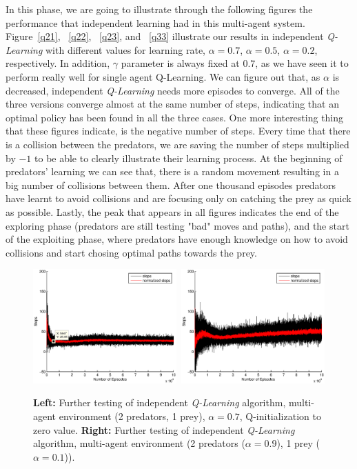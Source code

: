 \documentclass[a4paper,11pt]{article}
\begin{document}
In this phase, we are going to illustrate through the following figures the performance that independent learning had in this multi-agent system. 
Figure~\ref{q21}, ~\ref{q22}, ~\ref{q23}, and ~\ref{q33} illustrate our results in independent \textit{Q-Learning} with different values for learning rate, $\alpha = 0.7$, $\alpha = 0.5$, $\alpha = 0.2$, respectively. In addition, $\gamma$ parameter is always fixed at $0.7$, as we have seen it to perform really well for single agent {Q-Learning}. We can figure out that, as $\alpha$ is decreased, independent \textit{Q-Learning} needs more episodes to converge. All of the three versions converge almost at the same number of steps, indicating that an optimal policy has been found in all the three cases.   
One more interesting thing that these figures indicate, is the negative number of steps. Every time that there is a collision between the predators, we are saving the number of steps multiplied by $-1$ to be able to clearly illustrate their learning process. At the beginning of predators' learning we can see that, there is a random movement resulting in a big number of collisions between them. After one thousand episodes predators have learnt to avoid collisions and are focusing only on catching the prey as quick as possible. Lastly, the peak that appears in all figures indicates the end of the exploring phase (predators are still testing "bad" moves and paths), and the start of the exploiting phase, where predators have enough knowledge on how to avoid collisions and start chosing optimal paths towards the prey.

\begin{figure}[ht!]
  \centering
    \includegraphics[width=0.49\textwidth]{figures/q2init.eps}\	
    \includegraphics[width=0.49\textwidth]{figures/q2learnfast.eps}
    \caption{\textbf{Left:} Further testing of independent \textit{Q-Learning} algorithm, multi-agent environment (2 predators, 1 prey), $\alpha = 0.7$, Q-initialization to zero value. \textbf{Right:} Further testing of independent \textit{Q-Learning} algorithm, multi-agent environment (2 predators ($\alpha = 0.9$), 1 prey ($\alpha = 0.1$)).}
    \label{qtest}
\end{figure}
\end{document}
